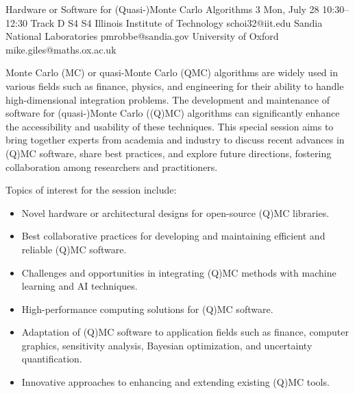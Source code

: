 \begin{talk}
  {Hardware or Software for (Quasi-)Monte Carlo Algorithms}%
  {3}%
  {}%
  {}%
  {}%
  {}%
  {Mon, July 28 10:30–12:30 Track D}%
  {S4}%
  {S4}%
  {%
    {Illinois Institute of Technology}%
    {schoi32@iit.edu}}%
  {%
	{Sandia National Laboratories}%
	{pmrobbe@sandia.gov}}%
  {%
	{University of Oxford}%
	{mike.giles@maths.ox.ac.uk}}%

Monte Carlo (MC) or quasi-Monte Carlo (QMC) algorithms are widely used in various fields such as finance, physics, and engineering for their ability to handle high-dimensional integration problems. The development and maintenance of software for (quasi-)Monte Carlo ((Q)MC) algorithms can significantly enhance the accessibility and usability of these techniques. This special session aims to bring together experts from academia and industry to discuss recent advances in (Q)MC software, share best practices, and explore future directions, fostering collaboration among researchers and practitioners.

Topics of interest for the session include:
\begin{itemize}
    \item Novel hardware or architectural designs for open-source (Q)MC libraries.
    \item Best collaborative practices for developing and maintaining efficient and reliable (Q)MC software.
    \item Challenges and opportunities in integrating (Q)MC methods with machine learning and AI techniques.
    \item High-performance computing solutions for (Q)MC software.
    \item Adaptation of (Q)MC software to application fields such as finance, computer graphics, sensitivity analysis, Bayesian optimization, and uncertainty quantification.
    \item Innovative approaches to enhancing and extending existing (Q)MC tools.
\end{itemize}



\end{talk}
